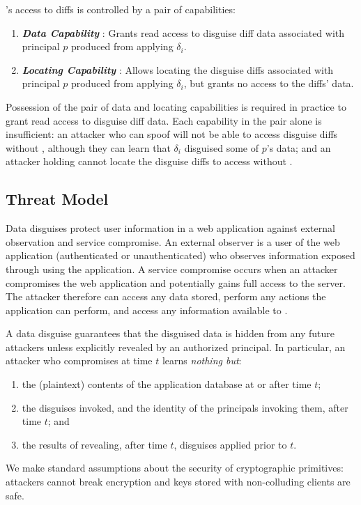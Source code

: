 \sys's access to diffs is controlled by a pair of capabilities: 
\begin{enumerate}
    \item \emph{\textbf{Data Capability }}: Grants read access to disguise diff data
        associated with principal $p$ produced from applying $\delta_i$.
    \item \emph{\textbf{Locating Capability }}: Allows locating the disguise
        diffs associated with principal $p$ produced from applying $\delta_i$, but grants no 
        access to the diffs' data.
\end{enumerate}

\noindent Possession of the pair of data and locating capabilities  is required in
practice to grant read access to disguise diff data.
Each capability in the pair alone is insufficient: an attacker who can spoof
 will not be able to access disguise diffs without
, although they can learn that $\delta_i$ disguised some of $p$'s data;
and an attacker holding  cannot locate the disguise diffs to access without
.

\subsection{Threat Model}
\label{s:threat}

%
Data disguises protect user information in a web application against external observation
and service compromise.
%
An external observer is a user of the web application (authenticated or unauthenticated) who
observes information exposed through using the application.
%
A service compromise occurs when an attacker compromises the web application and potentially
gains full access to the server.
%
The attacker therefore can access any data stored, perform any actions the application can
perform, and access any information available to \sys.
%

%
A data disguise guarantees that the disguised data is hidden from any future attackers unless
explicitly revealed by an authorized principal.
%
In particular, an attacker who compromises \sys at time $t$ learns \emph{nothing but}:
\begin{enumerate}[nosep]
  \item the (plaintext) contents of the application database at or after time $t$;
  \item the disguises invoked, and the identity of the principals invoking them, after time $t$; and
  \item the results of revealing, after time $t$, disguises applied prior to $t$.
\end{enumerate}
%
We make standard assumptions about the security of cryptographic primitives: attackers cannot
break encryption and keys stored with non-colluding clients are safe.
%

